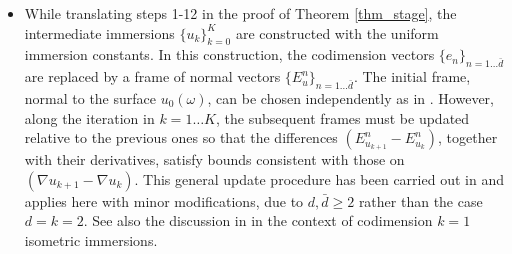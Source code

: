 \documentclass[reqno,twoside,11pt]{amsart}
\numberwithin{equation}{section}
\theoremstyle{plain}
\theoremstyle{definition}
\begin{document}
\begin{itemize}
\item[3.] While translating steps 1-12 in the proof of Theorem \ref{thm_stage},
the intermediate immersions $\{u_k\}_{k=0}^K$ are constructed with the
uniform immersion constants. In this construction, the
codimension vectors $\{e_n\}_{n=1\ldots\bar d}$ are replaced by a frame
of normal vectors $\{E_u^n\}_{n=1\ldots\bar d}$. 
The initial frame, normal to the surface $u_0(\omega)$, can be
chosen independently as in \cite{CaoIn2024}. However, along the
iteration in $k=1\ldots K$, the subsequent frames must be updated relative to
the previous ones so that the differences 
$(E^n_{u_{k+1}} - E^n_{u_k})$, together with
their derivatives, satisfy bounds consistent with those on
$(\nabla u_{k+1} - \nabla u_k)$. This general update procedure has been
carried out in \cite[Section 3]{lew_full2d2k} and applies here with
minor modifications, due to $d,\bar d \geq 2$ rather
than the case $d = k = 2$. See also the discussion in \cite{In2026} in
the context of codimension $k=1$ isometric immersions. 

\end{itemize}
\end{document}
